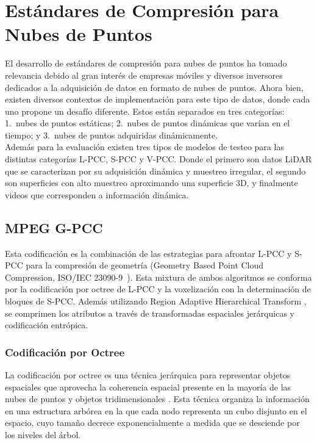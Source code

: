 \section{Estándares de Compresión para Nubes de Puntos}

    El desarrollo de estándares de compresión para nubes de puntos ha tomado relevancia
    debido al gran interés de empresas móviles y diversos inversores dedicados a la
    adquisición de datos en formato de nubes de puntos. Ahora bien, existen diversos
    contextos de implementación para este tipo de datos, donde cada uno propone un desafío
    diferente. Estos están separados en tres categorías: 1.~nubes de puntos estáticas;
    2.~nubes de puntos dinámicas que varían en el tiempo; y 3.~nubes de puntos adquiridas
    dinámicamente. \cite{graziosi2020overview}\\
    Además para la evaluación existen tres tipos de modelos de testeo para las distintas
    categorías L-PCC, S-PCC y V-PCC. Donde el primero son datos LiDAR que se caracterizan
    por su adquisición dinámica y muestreo irregular, el segundo son superficies con alto
    muestreo aproximando una superficie 3D, y finalmente videos que corresponden a
    información dinámica.

    \subsection{MPEG G-PCC}
        Esta codificación es la combinación de las estrategias para afrontar L-PCC y
        S-PCC para la compresión de geometría (Geometry Based Point Cloud Compression, ISO/IEC 23090-9~\cite{iso2023gpcc}).
        Esta mixtura de ambos algoritmos se conforma por la codificación por octree de
        L-PCC y la voxelización con la determinación de bloques de S-PCC. Además
        utilizando Region Adaptive Hierarchical Transform \cite{dequeiroz2016raht}, se comprimen los atributos a
        través de transformadas espaciales jerárquicas y codificación entrópica.

        \subsubsection{Codificación por Octree}
            La codificación por octree es una técnica jerárquica para representar objetos
            espaciales que aprovecha la coherencia espacial presente en la mayoría de las
            nubes de puntos y objetos tridimensionales \cite{meagher1982geometric,loop2016microsoft}.
            Esta técnica organiza la información en una estructura arbórea en la que cada
            nodo representa un cubo disjunto en el espacio, cuyo tamaño decrece
            exponencialmente a medida que se desciende por los niveles del árbol.\\


